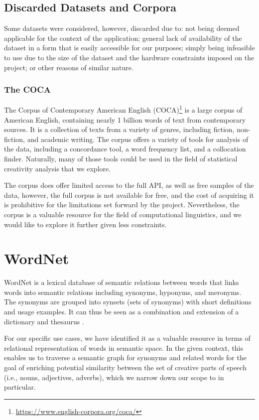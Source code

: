 
\subsection*{Discarded Datasets and Corpora}
Some datasets were considered, however, discarded due to: not being deemed applicable for the context of the application; general lack of availability of the dataset in a form that is easily accessible for our purposes; simply being infeasible to use due to the size of the dataset and the hardware constraints imposed on the project; or other reasons of similar nature.

\subsubsection*{The COCA}
The Corpus of Contemporary American English (COCA)\footnote[2]{\url{https://www.english-corpora.org/coca/}} is a large corpus of American English, containing nearly 1 billion words of text from contemporary sources. It is a collection of texts from a variety of genres, including fiction, non-fiction, and academic writing. The corpus offers a variety of tools for analysis of the data, including a concordance tool, a word frequency list, and a collocation finder. Naturally, many of those tools could be used in the field of statistical creativity analysis that we explore.

The corpus does offer limited access to the full API, as well as free samples of the data, however, the full corpus is not available for free, and the cost of acquiring it is prohibitive for the limitations set forward by the project. Nevertheless, the corpus is a valuable resource for the field of computational linguistics, and we would like to explore it further given less constraints.
\section{WordNet}
WordNet\citep{wordnet1998fellbaum} is a lexical database of semantic relations between words that links words into semantic relations including synonyms, hyponyms, and meronyms. The synonyms are grouped into synsets (sets of synonyms) with short definitions and usage examples. It can thus be seen as a combination and extension of a dictionary and thesaurus \citep{enwiki:1143619785}. 

For our specific use cases, we have identified it as a valuable resource in terms of relational representation of words in semantic space. In the given context, this enables us to traverse a semantic graph for synonyms and related words for the goal of enriching potential similarity between the set of creative parts of speech (i.e., nouns, adjectives, adverbs), which we narrow down our scope to in particular. 
